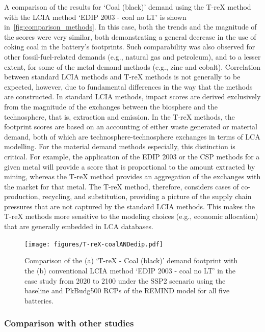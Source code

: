 \documentclass[a4paper,fleqn,longmktitle]{cas-dc}
\begin{document}
A comparison of the results for `Coal (black)' demand using the T-reX method with the LCIA method `EDIP 2003 - coal no LT' is shown in~\autoref{fig:comparison_methods}. In this case, both the trends and the magnitude of the scores were very similar, both demonstrating a general decrease in the use of coking coal in the battery's footprints. Such comparability was also observed for other fossil-fuel-related demands (e.g., natural gas and petroleum), and to a lesser extent, for some of the metal demand methods (e.g., zinc and cobalt). Correlation between standard LCIA methods and T-reX methods is not generally to be expected, however, due to fundamental differences in the way that the methods are constructed. In standard LCIA methods, impact scores are derived exclusively from the magnitude of the exchanges between the biosphere and the technosphere, that is, extraction and emission. In the T-reX methods, the footprint scores are based on an accounting of either waste generated or material demand, both of which are technosphere-technosphere exchanges in terms of LCA modelling. For the material demand methods especially, this distinction is critical. For example, the application of the EDIP 2003 or the CSP methods for a given metal will provide a score that is proportional to the amount extracted by mining, whereas the T-reX method provides an aggregation of the exchanges with the market for that metal. The T-reX method, therefore, considers cases of co-production, recycling, and substitution, providing a picture of the supply chain pressures that are not captured by the standard LCIA methods. This makes the T-reX methods more sensitive to the modeling choices (e.g., economic allocation) that are generally embedded in LCA databases.

\begin{figure}[H]
    \centering
    \texttt{[image: figures/T-reX-coalANDedip.pdf]}
    \caption{Comparison of the (a) `T-reX - Coal (black)' demand footprint with the (b) conventional LCIA method `EDIP 2003 - coal no LT'  in the case study from 2020 to 2100 under the SSP2 scenario using the baseline and PkBudg500 RCPs of the REMIND model for all five batteries.}\label{fig:comparison_methods}
\end{figure}

\subsubsection{Comparison with other studies}\label{sec:results-case_study-comparison}
\end{document}
